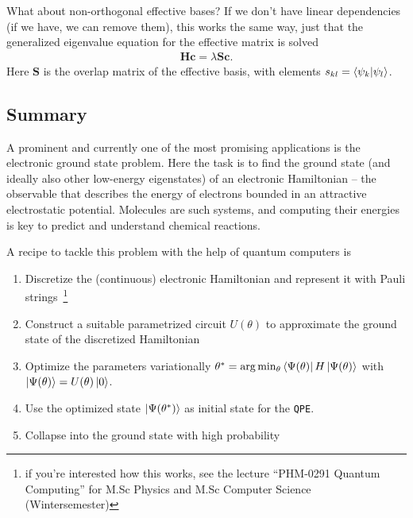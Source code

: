 What about non-orthogonal effective bases? If we don't have linear dependencies (if we have, we can remove them), this works the same way, just that the generalized eigenvalue equation for the effective matrix is solved
\begin{align}
    \mathbf{H}\mathbf{c} = \lambda \mathbf{S}\mathbf{c}.
\end{align}
Here $\mathbf{S}$ is the overlap matrix of the effective basis, with elements $s_{kl} = \braket{\psi_k}{\psi_l}$.

\clearpage
\subsection{Summary}

A prominent and currently one of the most promising applications is the electronic ground state problem. Here the task is to find the ground state (and ideally also other low-energy eigenstates) of an electronic Hamiltonian -- the observable that describes the energy of electrons bounded in an attractive electrostatic potential. Molecules are such systems, and computing their energies is key to predict and understand chemical reactions.

A recipe to tackle this problem with the help of quantum computers is
\begin{enumerate}
    \item Discretize the (continuous) electronic Hamiltonian and represent it with Pauli strings~\footnote{if you're interested how this works, see the lecture ``PHM-0291 Quantum Computing'' for M.Sc Physics and M.Sc Computer Science (Wintersemester)}
    \item Construct a suitable parametrized circuit $U(\theta)$ to approximate the ground state of the discretized Hamiltonian
    \item Optimize the parameters variationally $\theta^\ast = \arg\min_\theta \bra{\Psi(\theta)}H\ket{\Psi(\theta)}$ with $\ket{\Psi(\theta)} = U(\theta)\ket{0}$.
    \item Use the optimized state $ \ket{\Psi(\theta^\ast)}$ as initial state for the \texttt{QPE}.
    \item Collapse into the ground state with high probability
\end{enumerate}


